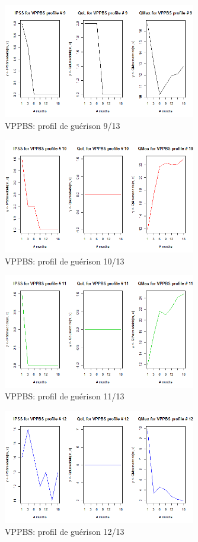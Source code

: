 \begin{figure}[H]
\centering
\includegraphics[width=0.75\textwidth]{../Fig/VPPBS/vppbs-profil-post-09.png}
\caption{VPPBS: profil de guérison 9/13}

\end{figure}

\begin{figure}[H]
\centering
\includegraphics[width=0.75\textwidth]{../Fig/VPPBS/vppbs-profil-post-10.png}
\caption{VPPBS: profil de guérison 10/13}
\end{figure}


\begin{figure}[H]
\centering
\includegraphics[width=0.75\textwidth]{../Fig/VPPBS/vppbs-profil-post-11.png}
\caption{VPPBS: profil de guérison 11/13}
\end{figure}

\begin{figure}[H]
\centering
\includegraphics[width=0.75\textwidth]{../Fig/VPPBS/vppbs-profil-post-12.png}
\caption{VPPBS: profil de guérison 12/13}
\end{figure}


%
